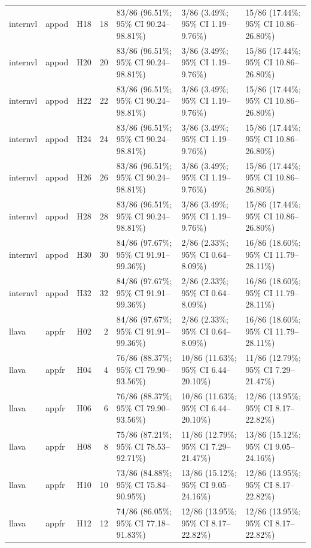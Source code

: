\begin{longtable}{lllrlll}
internvl & appod & H18 & 18 & 83/86 (96.51\%; 95\% CI 90.24–98.81\%) & 3/86 (3.49\%; 95\% CI 1.19–9.76\%) & 15/86 (17.44\%; 95\% CI 10.86–26.80\%) \\
internvl & appod & H20 & 20 & 83/86 (96.51\%; 95\% CI 90.24–98.81\%) & 3/86 (3.49\%; 95\% CI 1.19–9.76\%) & 15/86 (17.44\%; 95\% CI 10.86–26.80\%) \\
internvl & appod & H22 & 22 & 83/86 (96.51\%; 95\% CI 90.24–98.81\%) & 3/86 (3.49\%; 95\% CI 1.19–9.76\%) & 15/86 (17.44\%; 95\% CI 10.86–26.80\%) \\
internvl & appod & H24 & 24 & 83/86 (96.51\%; 95\% CI 90.24–98.81\%) & 3/86 (3.49\%; 95\% CI 1.19–9.76\%) & 15/86 (17.44\%; 95\% CI 10.86–26.80\%) \\
internvl & appod & H26 & 26 & 83/86 (96.51\%; 95\% CI 90.24–98.81\%) & 3/86 (3.49\%; 95\% CI 1.19–9.76\%) & 15/86 (17.44\%; 95\% CI 10.86–26.80\%) \\
internvl & appod & H28 & 28 & 83/86 (96.51\%; 95\% CI 90.24–98.81\%) & 3/86 (3.49\%; 95\% CI 1.19–9.76\%) & 15/86 (17.44\%; 95\% CI 10.86–26.80\%) \\
internvl & appod & H30 & 30 & 84/86 (97.67\%; 95\% CI 91.91–99.36\%) & 2/86 (2.33\%; 95\% CI 0.64–8.09\%) & 16/86 (18.60\%; 95\% CI 11.79–28.11\%) \\
internvl & appod & H32 & 32 & 84/86 (97.67\%; 95\% CI 91.91–99.36\%) & 2/86 (2.33\%; 95\% CI 0.64–8.09\%) & 16/86 (18.60\%; 95\% CI 11.79–28.11\%) \\
llava & appfr & H02 & 2 & 84/86 (97.67\%; 95\% CI 91.91–99.36\%) & 2/86 (2.33\%; 95\% CI 0.64–8.09\%) & 16/86 (18.60\%; 95\% CI 11.79–28.11\%) \\
llava & appfr & H04 & 4 & 76/86 (88.37\%; 95\% CI 79.90–93.56\%) & 10/86 (11.63\%; 95\% CI 6.44–20.10\%) & 11/86 (12.79\%; 95\% CI 7.29–21.47\%) \\
llava & appfr & H06 & 6 & 76/86 (88.37\%; 95\% CI 79.90–93.56\%) & 10/86 (11.63\%; 95\% CI 6.44–20.10\%) & 12/86 (13.95\%; 95\% CI 8.17–22.82\%) \\
llava & appfr & H08 & 8 & 75/86 (87.21\%; 95\% CI 78.53–92.71\%) & 11/86 (12.79\%; 95\% CI 7.29–21.47\%) & 13/86 (15.12\%; 95\% CI 9.05–24.16\%) \\
llava & appfr & H10 & 10 & 73/86 (84.88\%; 95\% CI 75.84–90.95\%) & 13/86 (15.12\%; 95\% CI 9.05–24.16\%) & 12/86 (13.95\%; 95\% CI 8.17–22.82\%) \\
llava & appfr & H12 & 12 & 74/86 (86.05\%; 95\% CI 77.18–91.83\%) & 12/86 (13.95\%; 95\% CI 8.17–22.82\%) & 12/86 (13.95\%; 95\% CI 8.17–22.82\%) \\

\end{longtable}
